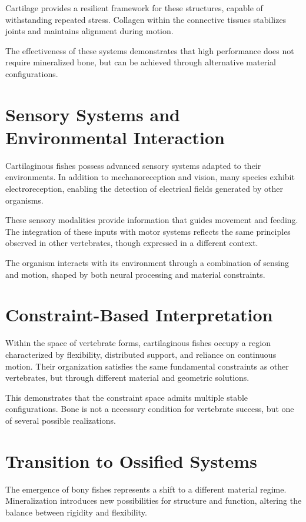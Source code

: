 \documentclass[11pt,oneside]{book}
\begin{document}
Cartilage provides a resilient framework for these structures, capable of withstanding repeated stress. Collagen within the connective tissues stabilizes joints and maintains alignment during motion.

The effectiveness of these systems demonstrates that high performance does not require mineralized bone, but can be achieved through alternative material configurations.

\section{Sensory Systems and Environmental Interaction}

Cartilaginous fishes possess advanced sensory systems adapted to their environments. In addition to mechanoreception and vision, many species exhibit electroreception, enabling the detection of electrical fields generated by other organisms.

These sensory modalities provide information that guides movement and feeding. The integration of these inputs with motor systems reflects the same principles observed in other vertebrates, though expressed in a different context.

The organism interacts with its environment through a combination of sensing and motion, shaped by both neural processing and material constraints.

\section{Constraint-Based Interpretation}

Within the space of vertebrate forms, cartilaginous fishes occupy a region characterized by flexibility, distributed support, and reliance on continuous motion. Their organization satisfies the same fundamental constraints as other vertebrates, but through different material and geometric solutions.

This demonstrates that the constraint space admits multiple stable configurations. Bone is not a necessary condition for vertebrate success, but one of several possible realizations.

\section{Transition to Ossified Systems}

The emergence of bony fishes represents a shift to a different material regime. Mineralization introduces new possibilities for structure and function, altering the balance between rigidity and flexibility.
\end{document}
